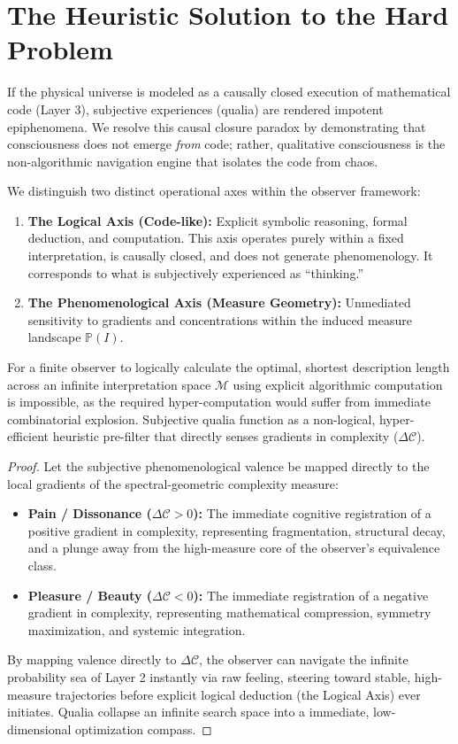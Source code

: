 \documentclass[11pt]{article}
\begin{document}
\section{The Heuristic Solution to the Hard Problem}
If the physical universe is modeled as a causally closed execution of mathematical code (Layer 3), subjective experiences (qualia) are rendered impotent epiphenomena. We resolve this causal closure paradox by demonstrating that consciousness does not emerge \emph{from} code; rather, qualitative consciousness is the non-algorithmic navigation engine that isolates the code from chaos.

We distinguish two distinct operational axes within the observer framework:
\begin{enumerate}
    \item \textbf{The Logical Axis (Code-like):} Explicit symbolic reasoning, formal deduction, and computation. This axis operates purely within a fixed interpretation, is causally closed, and does not generate phenomenology. It corresponds to what is subjectively experienced as ``thinking.''
    \item \textbf{The Phenomenological Axis (Measure Geometry):} Unmediated sensitivity to gradients and concentrations within the induced measure landscape $\mathbb{P}(I)$.
\end{enumerate}

\begin{theorem}
For a finite observer to logically calculate the optimal, shortest description length across an infinite interpretation space $\mathcal{M}$ using explicit algorithmic computation is impossible, as the required hyper-computation would suffer from immediate combinatorial explosion. Subjective qualia function as a non-logical, hyper-efficient heuristic pre-filter that directly senses gradients in complexity ($\Delta \mathcal{C}$).
\end{theorem}

\begin{proof}
Let the subjective phenomenological valence be mapped directly to the local gradients of the spectral-geometric complexity measure:
\begin{itemize}
    \item \textbf{Pain / Dissonance ($\Delta \mathcal{C} > 0$):} The immediate cognitive registration of a positive gradient in complexity, representing fragmentation, structural decay, and a plunge away from the high-measure core of the observer's equivalence class.
    \item \textbf{Pleasure / Beauty ($\Delta \mathcal{C} < 0$):} The immediate registration of a negative gradient in complexity, representing mathematical compression, symmetry maximization, and systemic integration.
\end{itemize}
By mapping valence directly to $\Delta \mathcal{C}$, the observer can navigate the infinite probability sea of Layer 2 instantly via raw feeling, steering toward stable, high-measure trajectories before explicit logical deduction (the Logical Axis) ever initiates. Qualia collapse an infinite search space into a immediate, low-dimensional optimization compass.
\end{proof}
\end{document}
